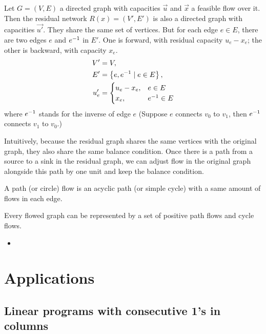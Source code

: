 \documentclass[UTF8,a4paper]{ctexart}
\begin{document}
\begin{definition}
    Let $G=(V, E)$ a directed graph with capacities $\vec{u}$ and $\vec{x}$ a feasible flow over it.
    Then the residual network $R(x)=(V', E')$ is also a directed graph with capacities $\vec{u'}$.
    They share the same set of vertices.
    But for each edge $e\in E$, there are two edges $e$ and ${e}^{-1}$ in $E'$.
    One is forward, with residual capacity $u_e-x_e$;
    the other is backward, with capacity $x_e$.
    \begin{align*}
        V' &=V,\\
        E' &=\left\{ e,{e}^{-1} \mid e\in E \right\},\\
        u'_e &=\begin{cases}
            u_e-x_e,&e\in E\\
            x_e,&{e}^{-1}\in E
        \end{cases}
    \end{align*}
    where ${e}^{-1}$ stands for the inverse of edge $e$
    (Suppose $e$ connects $v_0$ to $v_1$, then ${e}^{-1}$ connects $v_1$ to $v_0$.)

    Intuitively, because the residual graph shares the same vertices with the original graph,
    they also share the same balance condition.
    Once there is a path from a source to a sink in the residual graph,
    we can adjust flow in the original graph alongside this path by one unit and keep the balance condition.
\end{definition}

\begin{definition}
    A path (or circle) flow is an acyclic path (or simple cycle) with a same amount of flows in each edge.
\end{definition}

\begin{lemma}
    Every flowed graph can be represented by a set of positive path flows and cycle flows.
    \begin{itemize}
        \item
    \end{itemize}
\end{lemma}

\section{Applications}

\subsection{Linear programs with consecutive 1's in columns}
\end{document}

